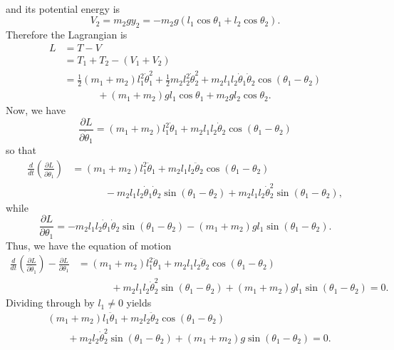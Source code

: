 \begin{questions}
\begin{solution}
\begin{align*}
\end{align*}
and its potential energy is
\[
V_2 = m_2 g y_2 = -m_2 g \left( l_1 \cos \theta_1 + l_2 \cos \theta_2 \right).
\]
Therefore the Lagrangian is
\begin{align*}
L &= T - V \\
&= T_1 + T_2 - \left( V_1 + V_2 \right) \\
&= \frac{1}{2} \left( m_1 + m_2 \right) l_1^2 \dot{\theta}_1^2 + \frac{1}{2} m_2 l_2^2 \dot{\theta}_2^2 + m_2 l_1 l_2 \dot{\theta}_1 \dot{\theta}_2 \cos \left( \theta_1 - \theta_2 \right) \\
&\phantom{=}\qquad + \left( m_1 + m_2 \right) g l_1 \cos \theta_1 + m_2 g l_2 \cos \theta_2.
\end{align*}
Now, we have
\[
\frac{\partial L}{\partial \dot{\theta}_1} = \left( m_1 + m_2 \right) l_1^2 \dot{\theta}_1 + m_2 l_1 l_2 \dot{\theta}_2 \cos \left( \theta_1 - \theta_2 \right)
\]
so that
\begin{align*}
\frac{d}{dt} \left( \frac{\partial L}{\partial \dot{\theta}_1} \right) &= \left( m_1 + m_2 \right) l_1^2 \ddot{\theta}_1 + m_2 l_1 l_2 \ddot{\theta}_2 \cos \left( \theta_1 - \theta_2 \right) \\
&\phantom{=}\qquad - m_2 l_1 l_2 \dot{\theta}_1 \dot{\theta}_2 \sin \left( \theta_1 - \theta_2 \right) + m_2 l_1 l_2 \dot{\theta}_2^2 \sin \left( \theta_1 - \theta_2 \right),
\end{align*}
while
\[
\frac{\partial L}{\partial \theta_1} = -m_2 l_1 l_2 \dot{\theta}_1 \dot{\theta}_2 \sin \left( \theta_1 - \theta_2 \right) - \left( m_1 + m_2 \right) g l_1 \sin \left( \theta_1 - \theta_2 \right).
\]
Thus, we have the equation of motion
\begin{align*}
\frac{d}{dt} \left( \frac{\partial L}{\partial \dot{\theta}_1} \right) - \frac{\partial L}{\partial \theta_1} &= \left( m_1 + m_2 \right) l_1^2 \ddot{\theta}_1 + m_2 l_1 l_2 \ddot{\theta}_2 \cos \left( \theta_1 - \theta_2 \right) \\
&\phantom{=}\qquad + m_2 l_1 l_2 \dot{\theta}_2^2 \sin \left( \theta_1 - \theta_2 \right) + \left( m_1 + m_2 \right) g l_1 \sin \left( \theta_1 - \theta_2 \right) = 0.
\end{align*}
Dividing through by $l_1 \neq 0$ yields
\begin{align*}
&\left( m_1 + m_2 \right) l_1 \ddot{\theta}_1 + m_2 l_2 \ddot{\theta}_2 \cos \left( \theta_1 - \theta_2 \right) \\
&\qquad + m_2 l_2 \dot{\theta}_2^2 \sin \left( \theta_1 - \theta_2 \right) + \left( m_1 + m_2 \right) g \sin \left( \theta_1 - \theta_2 \right) = 0.

\end{align*}
\end{solution}
\end{questions}
